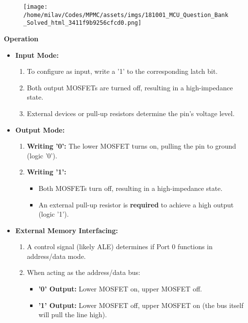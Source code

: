 \documentclass[
]{article}
\begin{document}
\begin{figure}
\centering
\texttt{[image: /home/milav/Codes/MPMC/assets/imgs/181001\_MCU\_Question\_Bank\_Solved\_html\_3411f9b9256cfcd0.png]}
\caption{}
\end{figure}

\textbf{Operation}

\begin{itemize}
\item
  \textbf{Input Mode:}

  \begin{enumerate}
  \def\labelenumi{\arabic{enumi}.}
  \item
    To configure as input, write a '1' to the corresponding latch bit.
  \item
    Both output MOSFETs are turned off, resulting in a high-impedance
    state.
  \item
    External devices or pull-up resistors determine the pin's voltage
    level.
  \end{enumerate}
\item
  \textbf{Output Mode:}

  \begin{enumerate}
  \def\labelenumi{\arabic{enumi}.}
  \item
    \textbf{Writing '0':} The lower MOSFET turns on, pulling the pin to
    ground (logic '0').
  \item
    \textbf{Writing '1':}

    \begin{itemize}
    \item
      Both MOSFETs turn off, resulting in a high-impedance state.
    \item
      An external pull-up resistor is \textbf{required} to achieve a
      high output (logic '1').
    \end{itemize}
  \end{enumerate}
\item
  \textbf{External Memory Interfacing:}

  \begin{enumerate}
  \def\labelenumi{\arabic{enumi}.}
  \item
    A control signal (likely ALE) determines if Port 0 functions in
    address/data mode.
  \item
    When acting as the address/data bus:

    \begin{itemize}
    \item
      \textbf{'0' Output:} Lower MOSFET on, upper MOSFET off.
    \item
      \textbf{'1' Output:} Lower MOSFET off, upper MOSFET on (the bus
      itself will pull the line high).
    \end{itemize}
  \end{enumerate}
\end{itemize}
\end{document}
